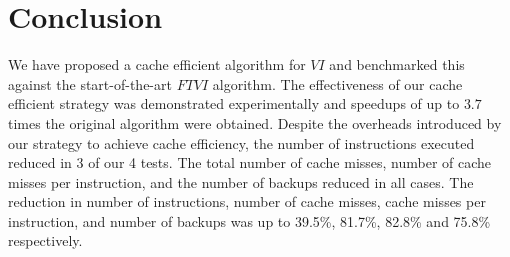 \documentclass[conference]{IEEEtran}
\begin{document}
\section{Conclusion}
\label{sec:conc}
We have proposed a cache efficient algorithm for $VI$ and benchmarked this against the start-of-the-art $FTVI$ algorithm. The effectiveness of our cache efficient strategy was demonstrated experimentally and speedups of up to $3.7$ times the original algorithm were obtained. Despite the overheads introduced by our strategy to achieve cache efficiency, the number of instructions executed reduced in 3 of our 4 tests. The total number of cache misses, number of cache misses per instruction, and the number of backups reduced in all cases. The reduction in number of instructions, number of cache misses, cache misses per instruction, and number of backups was up to 39.5\%, 81.7\%, 82.8\% and 75.8\% respectively.



\end{document}
